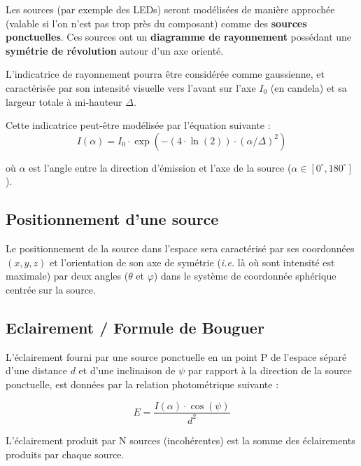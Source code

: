 Les sources (par exemple des LEDs) seront modélisées de manière approchée (valable si l'on n'est pas trop près du composant) comme des \textbf{sources ponctuelles}. Ces sources ont un \textbf{diagramme de rayonnement} possédant une \textbf{symétrie de révolution} autour d'un axe orienté. 

\medskip

L'indicatrice de rayonnement pourra être considérée comme gaussienne, et caractérisée par son intensité visuelle vers l'avant sur l'axe $I_0$ (en candela) et sa largeur totale à mi-hauteur $\Delta$.

Cette indicatrice peut-être modélisée par l'équation suivante : $$I(\alpha) = I_0 \cdot \exp(-(4 \cdot \ln(2)) \cdot (\alpha/\Delta)^2)$$

où $\alpha$ est l'angle entre la direction d'émission et l'axe de la source ($\alpha \in [0^{\circ}, 180^{\circ}]$). 

\medskip

\subsection{Positionnement d'une source}

Le positionnement de la source dans l'espace sera caractérisé par ses coordonnées $(x, y, z)$ et l'orientation de son axe de symétrie (\textit{i.e.} là où sont intensité est maximale) par deux angles ($\theta$ et $\varphi$) dans le système de coordonnée sphérique centrée sur la source. 
	
\medskip

\subsection{Eclairement / Formule de Bouguer}

L'éclairement fourni par une source ponctuelle en un point P de l'espace séparé d'une distance $d$ et d'une inclinaison de $\psi$ par rapport à la direction de la source ponctuelle, est données par la relation photométrique suivante : 

$$E = \frac{I(\alpha) \cdot \cos(\psi)}{d^2}$$



L'éclairement produit par N sources (incohérentes) est la somme des éclairements produits par chaque source.

